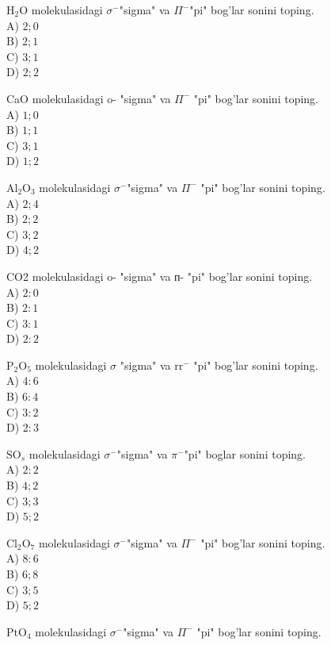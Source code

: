   \item $\mathrm{H}_{2} \mathrm{O}$ molekulasidagi $\sigma^{-}$"sigma" va $\Pi^{-}$"pi" bog'lar sonini toping.\\
A) $2 ; 0$\\
B) $2 ; 1$\\
C) $3 ; 1$\\
D) $2 ; 2$\\
  \item CaO molekulasidagi o- "sigma" va $\Pi^{-}$ "pi" bog'lar sonini toping.\\
A) $1 ; 0$\\
B) $1 ; 1$\\
C) $3 ; 1$\\
D) $1 ; 2$
  \item $\mathrm{Al}_{2} \mathrm{O}_{3}$ molekulasidagi $\sigma^{-}$"sigma" va $\Pi^{-}$ "pi" bog'lar sonini toping.\\
A) $2 ; 4$\\
B) $2 ; 2$\\
C) $3 ; 2$\\
D) $4 ; 2$
  \item CO2 molekulasidagi o- "sigma" va п- "pi" bog'lar sonini toping.\\
A) $2: 0$\\
B) $2: 1$\\
C) $3: 1$\\
D) $2: 2$
  \item $\mathrm{P}_{2} \mathrm{O}_{5}$ molekulasidagi $\sigma$ "sigma" va $\mathrm{rr}^{-}$ "pi" bog'lar sonini toping.\\
A) $4: 6$\\
B) $6: 4$\\
C) $3: 2$\\
D) $2: 3$
  \item $\mathrm{SO}_{s}$ molekulasidagi $\sigma^{-}$"sigma" va $\pi^{-}$"pi" boglar sonini toping.\\
A) $2: 2$\\
B) $4 ; 2$\\
C) $3 ; 3$\\
D) $5 ; 2$
  \item $\mathrm{Cl}_{2} \mathrm{O}_{7}$ molekulasidagi $\sigma^{-}$"sigma" va $\Pi^{-}$ "pi" bog'lar sonini toping.\\
A) $8: 6$\\
B) $6 ; 8$\\
C) $3 ; 5$\\
D) $5 ; 2$
  \item $\mathrm{PtO}_{4}$ molekulasidagi $\sigma^{-}$"sigma" va $\Pi^{-}$ "pi" bog'lar sonini toping.\\
